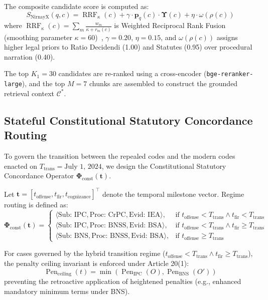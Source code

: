 \documentclass[conference]{IEEEtran}
\begin{document}
The composite candidate score is computed as:
\begin{equation}
S_{\text{NirnayX}}(q, c) = \operatorname{RRF}_{\kappa}(c) + \gamma \cdot \mathbf{p}_q(c) \cdot \mathbf{\Upsilon}(c) + \eta \cdot \omega(\rho(c))
\end{equation}
where $\operatorname{RRF}_{\kappa}(c) = \sum_{m} \frac{w_m}{\kappa + r_m(c)}$ is Weighted Reciprocal Rank Fusion (smoothing parameter $\kappa = 60$)~\cite{cormack2009reciprocal}, $\gamma = 0.20$, $\eta = 0.15$, and $\omega(\rho(c))$ assigns higher legal priors to Ratio Decidendi (1.00) and Statutes (0.95) over procedural narration (0.40).

The top $K_1 = 30$ candidates are re-ranked using a cross-encoder (\texttt{bge-reranker-large}), and the top $M = 7$ chunks are assembled to construct the grounded retrieval context $\mathcal{C}^*$.

\subsection{Stateful Constitutional Statutory Concordance Routing}
To govern the transition between the repealed codes and the modern codes enacted on $T_{\text{trans}} = \text{July 1, 2024}$, we design the Constitutional Statutory Concordance Operator $\mathbf{\Phi}_{\text{const}}(\mathbf{t})$.

Let $\mathbf{t} = [t_{\text{offense}}, t_{\text{fir}}, t_{\text{cognizance}}]^\top$ denote the temporal milestone vector. Regime routing is defined as:
\begin{equation}
\mathbf{\Phi}_{\text{const}}(\mathbf{t}) = \begin{cases}
\langle \text{Sub: IPC}, \text{Proc: CrPC}, \text{Evid: IEA} \rangle, & \text{if } t_{\text{offense}} < T_{\text{trans}} \land t_{\text{fir}} < T_{\text{trans}} \\
\langle \text{Sub: IPC}, \text{Proc: BNSS}, \text{Evid: BSA} \rangle, & \text{if } t_{\text{offense}} < T_{\text{trans}} \land t_{\text{fir}} \ge T_{\text{trans}} \\
\langle \text{Sub: BNS}, \text{Proc: BNSS}, \text{Evid: BSA} \rangle, & \text{if } t_{\text{offense}} \ge T_{\text{trans}}
\end{cases}
\end{equation}

For cases governed by the hybrid transition regime ($t_{\text{offense}} < T_{\text{trans}} \land t_{\text{fir}} \ge T_{\text{trans}}$), the penalty ceiling invariant is enforced under Article 20(1):
\begin{equation}
\operatorname{Pen}_{\text{ceiling}}(t) = \min\left(\operatorname{Pen}_{\text{IPC}}(O), \operatorname{Pen}_{\text{BNS}}(O')\right)
\end{equation}
preventing the retroactive application of heightened penalties (e.g., enhanced mandatory minimum terms under BNS).
\end{document}
